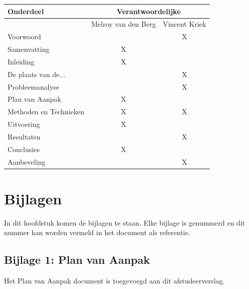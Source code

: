 \documentclass[]{article}
\begin{document}
\begin{tabular}{|| l | c | c ||}\hline
    Onderdeel              &   \multicolumn{2}{|c||}{Verantwoordelijke} \\\hline
                           & Melroy van den Berg & Vincent Kriek        \\\hline\hline
    Voorwoord              &                     &  X                   \\\hline
    Samenvatting           &       X             &                      \\\hline
    Inleiding              &       X             &                      \\\hline
    De plaats van de...    &                     &  X                   \\\hline
    Probleemanalyse        &                     &  X                   \\\hline
    Plan van Aanpak        &       X             &                      \\\hline
    Methoden en Technieken &       X             &  X                   \\\hline
    Uitvoering             &       X             &                      \\\hline
    Resultaten             &                     &  X                   \\\hline
    Conclusies             &       X             &                      \\\hline
    Aanbeveling            &                     &  X                   \\\hline
\end{tabular}              

\newpage
\pagestyle{empty}
\section{Bijlagen}

In dit hoofdstuk komen de bijlagen te staan. Elke bijlage is genummerd en
dit nummer kan worden vermeld in het document als referentie.

\subsection{Bijlage 1: Plan van Aanpak}
Het Plan van Aanpak document is toegevoegd aan dit afstudeerverslag.

\newpage
\end{document}
